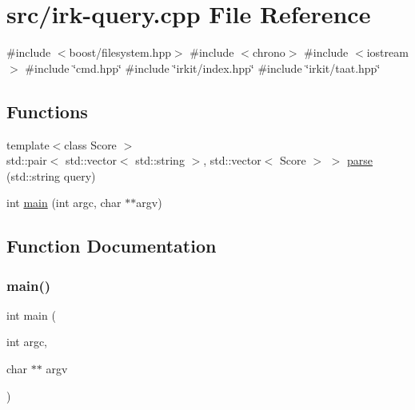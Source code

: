 \hypertarget{irk-query_8cpp}{}\section{src/irk-\/query.cpp File Reference}
\label{irk-query_8cpp}
{\ttfamily \#include $<$boost/filesystem.\+hpp$>$}\newline
{\ttfamily \#include $<$chrono$>$}\newline
{\ttfamily \#include $<$iostream$>$}\newline
{\ttfamily \#include \char`\"{}cmd.\+hpp\char`\"{}}\newline
{\ttfamily \#include \char`\"{}irkit/index.\+hpp\char`\"{}}\newline
{\ttfamily \#include \char`\"{}irkit/taat.\+hpp\char`\"{}}\newline
\subsection*{Functions}
\begin{DoxyCompactItemize}
\item 
{\footnotesize template$<$class Score $>$ }\\std\+::pair$<$ std\+::vector$<$ std\+::string $>$, std\+::vector$<$ Score $>$ $>$ \mbox{\hyperlink{irk-query_8cpp_a72a7accc4aac02043b4942649bd3fe88}{parse}} (std\+::string query)
\item 
int \mbox{\hyperlink{irk-query_8cpp_a3c04138a5bfe5d72780bb7e82a18e627}{main}} (int argc, char $\ast$$\ast$argv)
\end{DoxyCompactItemize}


\subsection{Function Documentation}
\mbox{\label{irk-query_8cpp_a3c04138a5bfe5d72780bb7e82a18e627}} 
\subsubsection{\texorpdfstring{main()}{main()}}
{\footnotesize\ttfamily int main (\begin{DoxyParamCaption}\item[{int}]{argc,  }\item[{char $\ast$$\ast$}]{argv }\end{DoxyParamCaption})}

